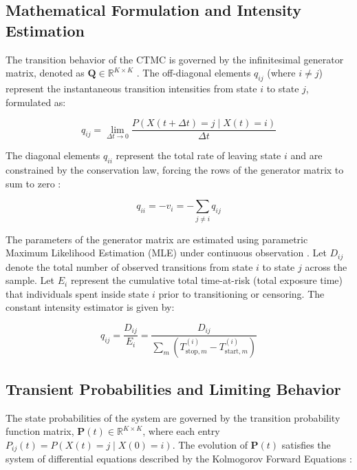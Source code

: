 \documentclass[9pt,a4paper,twocolumn,twoside]{rho-class/rho}
\begin{document}
    \subsection{Mathematical Formulation and Intensity Estimation}
        The transition behavior of the CTMC is governed by the infinitesimal generator matrix, denoted as $\mathbf{Q} \in \mathbb{R}^{K \times K}$ \cite{Norris1997}. The off-diagonal elements $q_{ij}$ (where $i \neq j$) represent the instantaneous transition intensities from state $i$ to state $j$, formulated as:

        \begin{equation}
            q_{ij} = \lim_{\Delta t \to 0} \frac{P(X(t + \Delta t) = j \mid X(t) = i)}{\Delta t}
        \end{equation}

        The diagonal elements $q_{ii}$ represent the total rate of leaving state $i$ and are constrained by the conservation law, forcing the rows of the generator matrix to sum to zero \cite{CoxMiller1965}:

        \begin{equation}
            q_{ii} = - v_i = - \sum_{j \neq i} q_{ij}
        \end{equation}

        The parameters of the generator matrix are estimated using parametric Maximum Likelihood Estimation (MLE) under continuous observation \cite{KalbfleischLawless1985}. Let $D_{ij}$ denote the total number of observed transitions from state $i$ to state $j$ across the sample. Let $E_i$ represent the cumulative total time-at-risk (total exposure time) that individuals spent inside state $i$ prior to transitioning or censoring. The constant intensity estimator is given by:

        \begin{equation}
            \hat{q}_{ij} = \frac{D_{ij}}{E_i} = \frac{D_{ij}}{\sum_{m} (T_{\text{stop}, m}^{(i)} - T_{\text{start}, m}^{(i)})}
        \end{equation}

    \subsection{Transient Probabilities and Limiting Behavior}
        The state probabilities of the system are governed by the transition probability function matrix, $\mathbf{P}(t) \in \mathbb{R}^{K \times K}$, where each entry $P_{ij}(t) = P(X(t) = j \mid X(0) = i)$. The evolution of $\mathbf{P}(t)$ satisfies the system of differential equations described by the Kolmogorov Forward Equations \cite{CoxMiller1965}:
\end{document}
